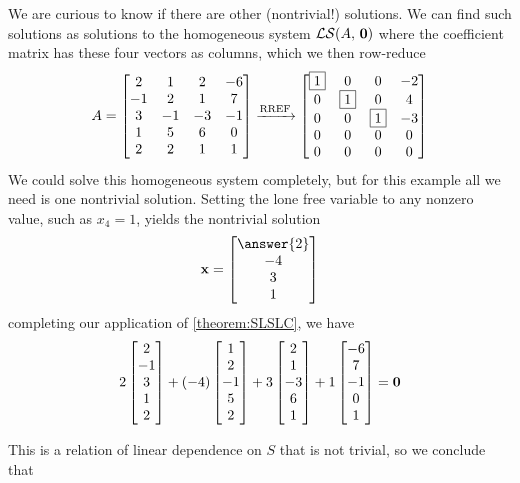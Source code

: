 \documentclass{ximera}
\begin{document}
\begin{example}
We are curious to know if there are other (nontrivial!) solutions.  We
can find such solutions as solutions to the homogeneous system
$\mathcal{LS}\!\left(A,\,\mathbf{0}\right)$ where the coefficient matrix has these four vectors
as columns, which we then row-reduce
\[
A=
\begin{bmatrix}
2&1&2&-6\\
-1&2&1&7\\
3&-1&-3&-1\\
1&5&6&0\\
2&2&1&1
\end{bmatrix}
\xrightarrow{\text{RREF}}
\begin{bmatrix}
\fbox{1}&0&0&-2\\
0&\fbox{1}&0&4\\
0&0&\fbox{1}&-3\\
0&0&0&0\\
0&0&0&0
\end{bmatrix}
\]
We could solve this homogeneous system completely, but for this
example all we need is one nontrivial solution.  Setting the lone free
variable to any nonzero value, such as $x_4=1$, yields the nontrivial
solution
\[
\vect{x}=\colvector{\answer{2}\\-4\\3\\1}
\]
completing our application of \ref{theorem:SLSLC}, we have
\[
2\begin{bmatrix}2\\-1\\3\\1\\2\end{bmatrix}+
(-4)\begin{bmatrix}1\\2\\-1\\5\\2\end{bmatrix}+
3\begin{bmatrix}2\\1\\-3\\6\\1\end{bmatrix}+
1\begin{bmatrix}-6\\7\\-1\\0\\1\end{bmatrix}
=\mathbf{0}
\]

This is a relation of linear dependence on $S$ that is not trivial, so we conclude that
\begin{multipleChoice}
\end{multipleChoice}
\end{example}
\end{document}

